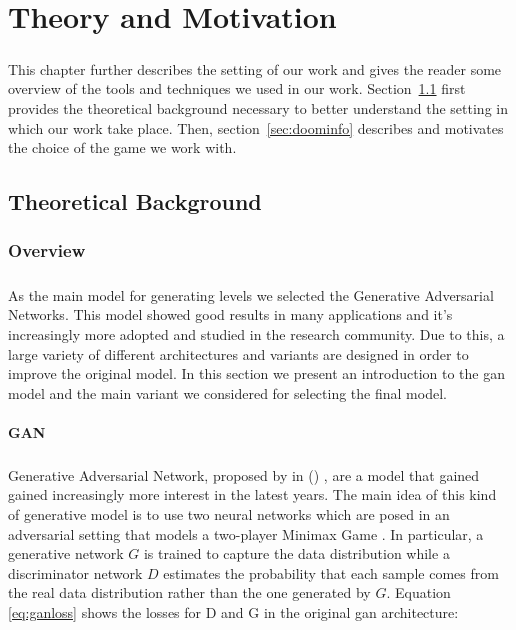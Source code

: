 \chapter{Theory and Motivation}
\paragraph{} This chapter further describes the setting of our work and gives the reader some overview of the tools and techniques we used in our work. Section~\ref{sec:gantheory} first provides the theoretical background necessary to better understand the setting in which our work take place. Then, section~\ref{sec:doominfo} describes and motivates the choice of the game we work with. 

\section{Theoretical Background}
\label{sec:gantheory}
\subsection{Overview}
\paragraph{} As the main model for generating levels we selected the Generative Adversarial Networks. This model showed good results in many applications and it's increasingly more adopted and studied in the research community. Due to this, a large variety of different architectures and variants are designed in order to improve the original model. In this section we present an introduction to the \gls{gan} model and the main variant we considered for selecting the final model. 

\subsubsection{GAN}
\label{sec:introgan}
\paragraph{} Generative Adversarial Network, proposed by \citeauthor{gan} in  (\citeyear{gan}) \cite{gan}, are a model that gained gained increasingly more interest in the latest years. The main idea of this kind of generative model is to use two neural networks which are posed in an adversarial setting that models a two-player Minimax Game \cite[p.~276]{minimax}. In particular, a generative network $G$ is trained to capture the data distribution while a discriminator network $D$ estimates the probability that each sample comes from the real data distribution rather than the one generated by $G$. 
Equation \ref{eq:ganloss} shows the losses for D and G in the original \gls{gan} architecture\cite{gan}:

